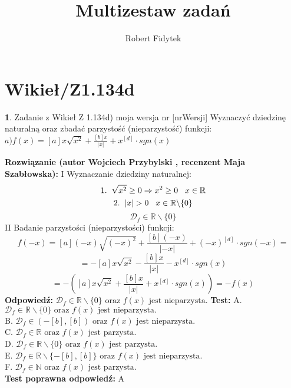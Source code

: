 \documentclass[12pt, a4paper]{article}
\title{Multizestaw zadań}
\author{Robert Fidytek}
\date{}
\theoremstyle{definition} %
\newtheorem{zad}{}
\newcommand{\kategoria}[1]{\section{#1}} %
\newcommand{\zadStart}[1]{\begin{zad}#1\newline} %
\newcommand{\zadStop}{\end{zad}}   %
\newcommand{\rozwStart}[2]{\noindent \textbf{Rozwiązanie (autor #1 , recenzent #2): }\newline} %
\newcommand{\rozwStop}{\newline}                                            %
\newcommand{\odpStart}{\noindent \textbf{Odpowiedź:}\newline}    %
\newcommand{\odpStop}{\newline}                                             %
\newcommand{\testStart}{\noindent \textbf{Test:}\newline} %
\newcommand{\testStop}{\newline} %
\newcommand{\kluczStart}{\noindent \textbf{Test poprawna odpowiedź:}\newline} %
\newcommand{\kluczStop}{\newline} %
\begin{document}
\maketitle


\kategoria{Wikieł/Z1.134d}
\zadStart{Zadanie z Wikieł Z 1.134d) moja wersja nr [nrWersji]}
Wyznaczyć dziedzinę naturalną oraz zbadać parzystość (nieparzystość) funkcji:\\
$a) f(x)=[a]x\sqrt{x^{2}}+\frac{[b]x}{|x|}+x^{[d]}\cdot sgn(x)$
\zadStop
\rozwStart{Wojciech Przybylski}{Maja Szabłowska}
I Wyznaczanie dziedziny naturalnej:\\
$$1.\hspace{2mm}\sqrt{x^{2}}\geq0 \Rightarrow x^{2}\geq0 \hspace{3mm} x\in\mathbb{R}$$
$$2.\hspace{2mm}|x|>0 \hspace{3mm} x\in\mathbb{R}\backslash\{0\}$$
$$\mathcal{D}_{f}\in\mathbb{R}\backslash\{0\}$$
II Badanie parzystości (nieparzystości) funkcji:
$$f(-x)=[a](-x)\sqrt{(-x)^{2}}+\frac{[b](-x)}{|-x|}+(-x)^{[d]}\cdot sgn(-x)=$$
$$=-[a]x\sqrt{x^{2}}-\frac{[b]x}{|x|}-x^{[d]}\cdot sgn(x)$$
$$=-([a]x\sqrt{x^{2}}+\frac{[b]x}{|x|}+x^{[d]}\cdot sgn(x))=-f(x)$$
\rozwStop
\odpStart
$\mathcal{D}_{f}\in\mathbb{R}\backslash\{0\} \mbox{ oraz } f(x)\mbox{ jest nieparzysta.}$ 
\odpStop
\testStart
A. $\mathcal{D}_{f}\in\mathbb{R}\backslash\{0\} \mbox{ oraz } f(x)\mbox{ jest nieparzysta.}$  \\
B. $\mathcal{D}_{f}\in (-[b],[b]) \mbox{ oraz } f(x)\mbox{ jest nieparzysta.}$ \\
C. $\mathcal{D}_{f}\in \mathbb{R} \mbox{ oraz } f(x)\mbox{ jest parzysta.}$ \\
D. $\mathcal{D}_{f}\in \mathbb{R}\backslash\{0\} \mbox{ oraz } f(x)\mbox{ jest parzysta.}$ \\
E. $\mathcal{D}_{f}\in \mathbb{R}{\backslash}\{-[b],[b]\} \mbox{ oraz } f(x)\mbox{ jest nieparzysta.}$ \\
F. $\mathcal{D}_{f}\in \mathbb{N} \mbox{ oraz } f(x)\mbox{ jest parzysta.}$ \\
\testStop
\kluczStart
A
\kluczStop
\end{document}
